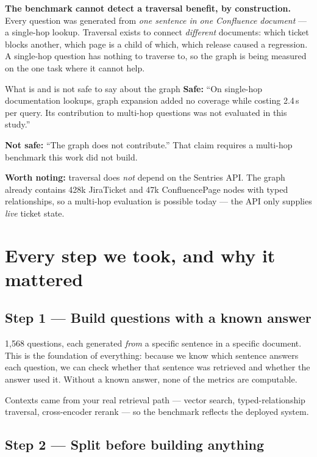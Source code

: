 \documentclass[11pt,a4paper]{article}
\begin{document}
\textbf{The benchmark cannot detect a traversal benefit, by construction.} Every
question was generated from \emph{one sentence in one Confluence document} --- a
single-hop lookup. Traversal exists to connect \emph{different} documents: which
ticket blocks another, which page is a child of which, which release caused a
regression. A single-hop question has nothing to traverse to, so the graph is
being measured on the one task where it cannot help.

\begin{warnbox}{{What is and is not safe to say about the graph}}
\textbf{Safe:} ``On single-hop documentation lookups, graph expansion added no
coverage while costing 2.4\,s per query. Its contribution to multi-hop questions
was not evaluated in this study.''

\textbf{Not safe:} ``The graph does not contribute.'' That claim requires a
multi-hop benchmark this work did not build.

\textbf{Worth noting:} traversal does \emph{not} depend on the Sentries API. The
graph already contains 428k JiraTicket and 47k ConfluencePage nodes with typed
relationships, so a multi-hop evaluation is possible today --- the API only
supplies \emph{live} ticket state.
\end{warnbox}

\section{Every step we took, and why it mattered}

\subsection{Step 1 --- Build questions with a known answer}

1{,}568 questions, each generated \emph{from} a specific sentence in a specific
document. This is the foundation of everything: because we know which sentence
answers each question, we can check whether that sentence was retrieved and
whether the answer used it. Without a known answer, none of the metrics are
computable.

Contexts came from your real retrieval path --- vector search, typed-relationship
traversal, cross-encoder rerank --- so the benchmark reflects the deployed system.

\subsection{Step 2 --- Split before building anything}
\end{document}
